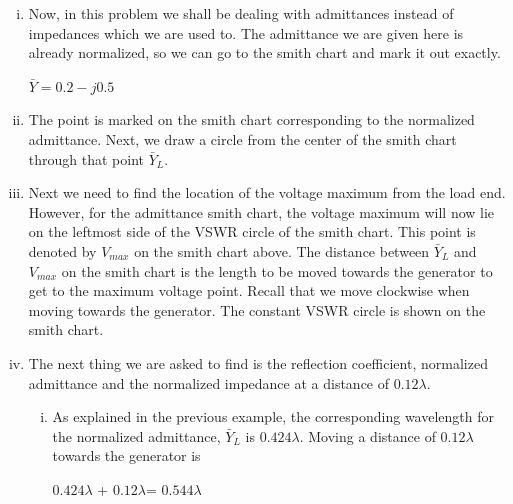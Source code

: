 \begin{example}
\begin{enumerate}[(i)]
\item Now, in this problem we shall be dealing with admittances instead of impedances which we are used to. The admittance we are given here is already normalized, so we can go to the smith chart and mark it out exactly.
\begin{center}
$\bar{Y} = 0.2 - j0.5$
\end{center}
\item The point is marked on the smith chart corresponding to the normalized admittance. Next, we draw a circle from the center of the smith chart through that point $\bar{Y}_L$.
\item Next we need to find the location of the voltage maximum from the load end. However, for the admittance smith chart, the voltage maximum will now lie on the leftmost side of the VSWR circle of the smith chart. This point is denoted by $V_{max}$ on the smith chart above. The distance between  $\bar{Y}_L$ and $V_{max}$ on the smith chart is the length to be moved towards the generator to get to the maximum voltage point. Recall that we move clockwise when moving towards the generator. The constant VSWR circle is shown on the smith chart.
\item The next thing we are asked to find is the reflection coefficient, normalized admittance and the normalized impedance at a distance of $0.12\lambda$.
\begin{enumerate}[(i)]
\item As explained in the previous example, the corresponding wavelength for the normalized admittance, $\bar{Y}_L$ is $0.424\lambda$. Moving a distance of $0.12\lambda$ towards the generator is 
\begin{center}
$0.424\lambda$ + $0.12\lambda$= $0.544\lambda$
\end{center}


\end{enumerate}
\end{enumerate}
\end{example}
